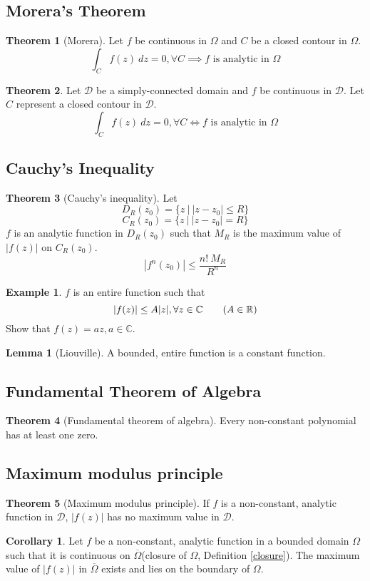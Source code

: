 \documentclass[10pt, a4paper]{extarticle}
\theoremstyle{definition}
\newtheorem{thm}{Theorem}
\newtheorem{lem}{Lemma}[thm]
\newtheorem{cor}{Corollary}[thm]
\newtheorem{eg}{Example}
\begin{document}
	\subsection{Morera's Theorem}
	\begin{thm}[Morera]
		Let $f$ be continuous in $\Omega$ and $C$ be a closed contour in $\Omega$.
		\[\int_Cf(z)\ dz=0,\forall C\implies f \text{ is analytic in }\Omega\]
	\end{thm}

	\begin{thm}
		Let $\mathscr{D}$ be a simply-connected domain and $f$ be continuous in $\mathscr{D}$. Let $C$ represent a closed contour in $\mathscr{D}$.
		\[\int_Cf(z)\ dz=0,\forall C\iff f \text{ is analytic in }\Omega\]
	\end{thm}

	\subsection{Cauchy's Inequality}
	\begin{thm}[Cauchy's inequality]
		Let
		\[D_R(z_0)=\{z\ |\ |z-z_0|\leq R\}\]
		\[C_R(z_0)=\{z\ |\ |z-z_0|=R\}\]
		$f$ is an analytic function in $D_R(z_0)$ such that $M_R$ is the maximum value of $|f(z)|$ on $C_R(z_0)$.
		\[\left|f^n(z_0)\right|\leq \frac{n!\ M_R}{R^n}\tag*{($n=1,2,\cdots$)}\]
	\end{thm}
	\begin{eg}
		$f$ is an entire function such that
		\[|f(z)|\leq A|z|,\forall z\in\mathbb{C}\tag*{($A\in\mathbb{R}$)}\]
		Show that $f(z)=az,a\in\mathbb{C}$.
	\end{eg}
	\begin{lem}[Liouville]
		A bounded, entire function is a constant function.
	\end{lem}

	\subsection{Fundamental Theorem of Algebra}
	\begin{thm}[Fundamental theorem of algebra]
		Every non-constant polynomial has at least one zero.
	\end{thm}

	\subsection{Maximum modulus principle}
	

	\begin{thm}[Maximum modulus principle]
		If $f$ is a non-constant, analytic function in $\mathscr{D}$, $|f(z)|$ has no maximum value in $\mathscr{D}$.
	\end{thm}
	\begin{cor}
		Let $f$ be a non-constant, analytic function in a bounded domain $\Omega$ such that it is continuous on $\overline{\Omega}$(closure of $\Omega$, Definition \ref{closure}). The maximum value of $|f(z)|$ in $\overline{\Omega}$ exists and lies on the boundary of $\Omega$.
	\end{cor}
\end{document}
